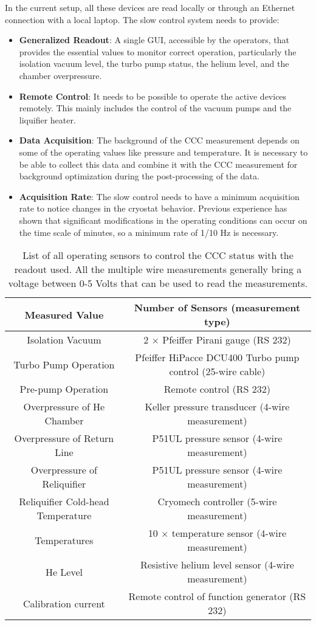 \documentclass[12pt,a4paper]{report}
\begin{document}
       In the current setup, all these devices are read locally or through an Ethernet connection with a local laptop. The slow control system needs to provide:
       \begin{itemize}
       	\item \textbf{Generalized Readout}: A single GUI, accessible by the operators, that provides the essential values to monitor correct operation, particularly the isolation vacuum level, the turbo pump status, the helium level, and the chamber overpressure.
       	\item \textbf{Remote Control}: It needs to be possible to operate the active devices remotely. This mainly includes the control of the vacuum pumps and the liquifier heater.
       	\item \textbf{Data Acquisition}: The background of the CCC measurement depends on some of the operating values like pressure and temperature. It is necessary to be able to collect this data and combine it with the CCC measurement for background optimization during the post-processing of the data.
       	\item \textbf{Acquisition Rate}: The slow control needs to have a minimum acquisition rate to notice changes in the cryostat behavior. Previous experience has shown that significant modifications in the operating conditions can occur on the time scale of minutes, so a minimum rate of 1/10 Hz is necessary.
       \end{itemize}
		\begin{table}[H]
			\centering
			\begin{tabular}{c|c}
				\hline
				Measured Value & Number of Sensors (measurement type)  \\
				\hline
				Isolation Vacuum & 2 $\times$ Pfeiffer Pirani gauge (RS 232)\\
				Turbo Pump Operation & Pfeiffer HiPacce DCU400 Turbo pump control (25-wire cable)\\
				Pre-pump Operation & Remote control (RS 232)\\
				Overpressure of He Chamber & Keller pressure transducer (4-wire measurement) \\
				Overpressure of Return Line & P51UL pressure sensor (4-wire measurement)\\
				Overpressure of Reliquifier & P51UL pressure sensor (4-wire measurement)\\
				Reliquifier Cold-head Temperature & Cryomech controller (5-wire measurement)\\
				Temperatures & 10 $\times$ temperature sensor (4-wire measurement)\\
				He Level & Resistive helium level sensor (4-wire measurement)\\
				Calibration current & Remote control of function generator (RS 232)\\
				\hline
			\end{tabular}
			\caption{List of all operating sensors to control the CCC status with the readout used. All the multiple wire measurements generally bring a voltage between 0-5 Volts that can be used to read the measurements.}
			\label{CH4_table}
		\end{table}
\end{document}
